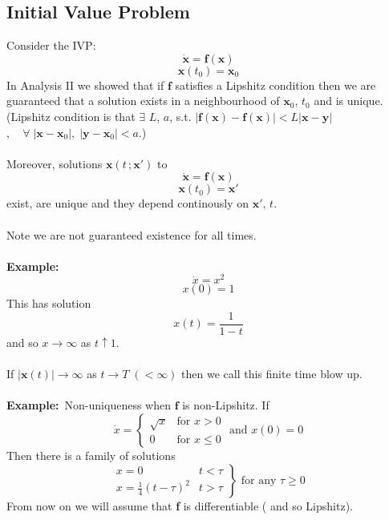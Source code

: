 \documentclass{article}
\newcommand{\example}{\textbf{Example:}}                    %
\begin{document}
\subsection{Initial Value Problem}
Consider the IVP: 
\[ \dot{\textbf{x}} = \textbf{f}(\textbf{x})  \]
\[ \textbf{x}(t_0)  = \textbf{x}_0\]
In Analysis II we showed that if $\textbf{f}$ satisfies a Lipshitz condition
then we are guaranteed that a solution exists in a neighbourhood of $\textbf{x}_0$,
$ t_0$ and is unique.
\\
(Lipshitz condition is that $\exists$ $L$, $a$, s.t. 
$|\textbf{f}(\textbf{x})- \textbf{f}(\textbf{x})| < L|\textbf{x} - \textbf{y}|$
$, \quad \forall \; |\textbf{x}-\textbf{x}_0|, \; |\textbf{y}-\textbf{x}_0| < a$.)
\\
\\
Moreover, solutions $\textbf{x}(t \, ; \textbf{x}')$ to 
\[ \dot{\textbf{x}} = \textbf{f}(\textbf{x})  \]
\[ \textbf{x}(t_0)  = \textbf{x}'\]
exist, are unique and they depend continously on $\textbf{x}' , \, t$.
\\
\\
Note we are not guaranteed existence for all times.
\\
\\
\example\ 
\[ \dot{x} = x^2  \]
\[ x(0)  = 1\]
This has solution
\[ x(t) = \frac{1}{1-t} \]
and so $x \to \infty$ as $t \uparrow 1$.
\\
\\
If $|\textbf{x}(t)| \to \infty$ as $t \to T \;(< \infty)$ then we call this
finite time blow up.
\\
\\
\example\ Non-uniqueness when $\textbf{f}$ is non-Lipshitz. If
\[ \dot{x} = \left\{\begin{array}{lr}
				\sqrt{x} & \mbox{for } x >0 \\
				0        & \mbox{for } x \leq 0
				\end{array}
\right. \mbox{ and } x(0) = 0 \]
Then there is a family of solutions
\[ \left. \begin{array}{lr} 
				x = 0 & t < \tau \\
				x = \frac{1}{4}(t - \tau)^2 & t > \tau
\end{array} \right\} \mbox{ for any } \tau \geq 0 \]
From now on we will assume that \textbf{f} is differentiable ( and so Lipshitz).
\\
\end{document}
